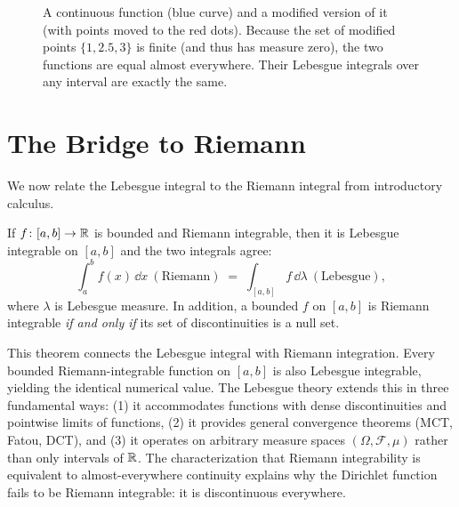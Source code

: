 \begin{figure}[H]
\centering
{}
\caption{A continuous function (blue curve) and a modified version of it (with points moved to the red dots). Because the set of modified points $\{1, 2.5, 3\}$ is finite (and thus has measure zero), the two functions are equal almost everywhere. Their Lebesgue integrals over any interval are exactly the same.}
\label{ch37:fig-ae}
\end{figure}

\section{The Bridge to Riemann}
\label{ch37:riemann-bridge}

We now relate the Lebesgue integral to the Riemann integral from introductory calculus.

\begin{theorem}
\label{ch37:thm-riemann}
If $f\colon[a,b]\to\mathbb{R}$ is bounded and Riemann integrable, then it is Lebesgue
integrable on $[a,b]$ and the two integrals agree:
\[
  \int_a^b f(x)\,\dd x \ (\text{Riemann}) \;=\; \int_{[a,b]} f\,\dd\lambda
  \ (\text{Lebesgue}),
\]
where $\lambda$ is Lebesgue measure. In addition, a bounded $f$ on $[a,b]$ is
Riemann integrable \emph{if and only if} its set of discontinuities is a null
set.
\end{theorem}

\begin{connectionbox}
This theorem connects the Lebesgue integral with Riemann integration. Every bounded
Riemann-integrable function on $[a,b]$ is also Lebesgue integrable, yielding the
identical numerical value. The Lebesgue theory extends this in three fundamental ways:
(1) it accommodates functions with dense discontinuities and pointwise limits of functions,
(2) it provides general convergence theorems (MCT, Fatou, DCT), and (3) it operates on
arbitrary measure spaces $(\Omega, \mathcal{F}, \mu)$ rather than only intervals of $\mathbb{R}$.
The characterization that Riemann integrability is equivalent to almost-everywhere
continuity explains why the Dirichlet function fails to be Riemann integrable: it is
discontinuous everywhere.
\end{connectionbox}

